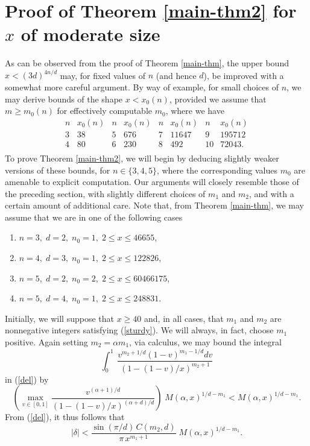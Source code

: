 \section{Proof of Theorem \ref{main-thm2} for $x$ of moderate size }  \label{sec-main-thm2}

As can be observed from the proof of Theorem \ref{main-thm}, the upper bound $x <  (3d)^{4n/d}$ may, for fixed values of $n$ (and hence $d$), be improved with a somewhat more careful argument. By way of example, for small choices of $n$, we may derive bounds of the shape $x < x_0(n)$, provided we assume that $m \geq m_0 (n)$ for effectively computable $m_0$, where we have
$$
\begin{array}{cc|cc|cc|cc} \hline
n & x_0(n) & n & x_0(n) & n & x_0(n) & n & x_0(n) \\ \hline
3 & 38 & 5 & 676 & 7 & 11647 & 9 & 195712 \\
4 & 80  & 6 & 230 & 8 & 492 & 10 &  72043. \\
\end{array}
$$
To prove Theorem \ref{main-thm2}, we will begin by deducing slightly weaker versions of these bounds, for $n \in \{ 3, 4, 5 \}$, where the corresponding values $m_0$ are amenable to explicit computation. Our arguments will closely resemble those of the preceding section, with slightly different choices of $m_1$ and $m_2$, and with a certain amount of additional care. Note that, from Theorem \ref{main-thm}, we may assume that we are in one of the following cases
\begin{enumerate}
\item $n=3, \; d=2, \;  n_0=1, \; 2 \leq x \leq 46655$,
\item $n=4, \; d=3, \; n_0=1, \; 2 \leq x \leq 122826$,
\item $n=5, \; d=2, \; n_0=2, \; 2 \leq x \leq 60466175$,
\item $n=5, \; d=4, \; n_0=1, \; 2 \leq x \leq 248831$.
\end{enumerate}
Initially, we will suppose that $x \geq 40$ and, in all cases, that $m_1$ and $m_2$ are nonnegative integers satisfying (\ref{sturdy}). We will always, in fact, choose $m_1$ positive. Again setting $m_2=\alpha m_1$, 
via calculus, we may bound the integral 
\[\int^{1}_{0} ~
\frac{v^{m_2+1/d} (1-v)^{m_1-1/d} dv}{(1-(1-v)/x)^{m_2+1}}\]
in (\ref{del}) by
$$
\left( \max_{v \in [0,1]} \frac{v^{(\alpha+1)/d}}{ \left( 1 - (1-v)/x \right)^{(\alpha+d)/d}} \right) 
\; M(\alpha,x)^{1/d-m_1} < M(\alpha,x)^{1/d-m_1}.
$$
From (\ref{del}), it thus follows that
\begin{equation} \label{del-upper}
|\delta| < \frac{\sin (\pi/d) \, C(m_2,d)}{\pi \,  x^{m_1+1}} \;  M(\alpha,x)^{1/d-m_1}.
\end{equation}


